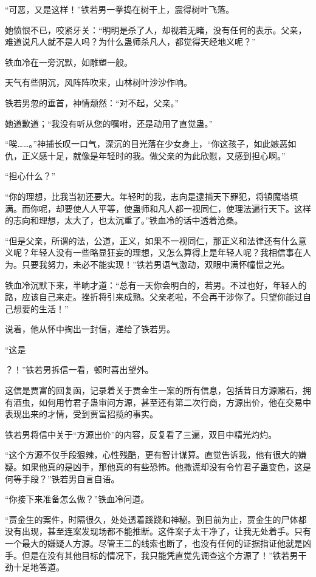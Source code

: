 \begin{this_body}
“可恶，又是这样！”铁若男一拳捣在树干上，震得树叶飞落。

她愤恨不已，咬紧牙关：“明明是杀了人，却视若无睹，没有任何的表示。父亲，难道说凡人就不是人吗？为什么蛊师杀凡人，都觉得天经地义呢？”

铁血冷在一旁沉默，如雕塑一般。

天气有些阴沉，风阵阵吹来，山林树叶沙沙作响。

铁若男忽的垂首，神情颓然：“对不起，父亲。”

她道歉道；“我没有听从您的嘱咐，还是动用了直觉蛊。”

“唉……。”神捕长叹一口气，深沉的目光落在少女身上，“你这孩子，如此嫉恶如仇，正义感十足，就像是年轻时的我。做父亲的为此欣慰，又感到担心啊。”

“担心什么？”

“你的理想，比我当初还要大。年轻时的我，志向是逮捕天下罪犯，将镇魔塔填满。而你呢，却要使人人平等，使蛊师和凡人都一视同仁，使理法遍行天下。这样的志向和理想，太大了，也太沉重了。”铁血冷的话中透着沧桑。

“但是父亲，所谓的法，公道，正义，如果不一视同仁，那正义和法律还有什么意义呢？年轻人没有一些略显狂妄的理想，又怎么算得上是年轻人呢？我相信事在人为。只要我努力，未必不能实现！”铁若男语气激动，双眼中满怀幢憬之光。

铁血冷沉默下来，半晌才道：“总有一天你会明白的，若男。不过也好，年轻人的路，应该自己来走。挫折将引来成熟。父亲老啦，不会再干涉你了。只望你能过自己想要的生活！”

说着，他从怀中掏出一封信，递给了铁若男。

“这是

？！”铁若男拆信一看，顿时喜出望外。

这信是贾富的回复函，记录着关于贾金生一案的所有信息，包括昔日方源赌石，拥有酒虫，如何用竹君子蛊审问方源，甚至还有第二次行商，方源出价，他在交易中表现出来的才情，受到贾富招揽的事实。

铁若男将信中关于“方源出价”的内容，反复看了三遍，双目中精光灼灼。

“这个方源不仅手段狠辣，心性残酷，更有智计谋算。直觉告诉我，他有很大的嫌疑。如果他真的是凶手，那他真的有些恐怖。他撒谎却没有令竹君子蛊变色，这是何等手段？”铁若男自言自语。

“你接下来准备怎么做？”铁血冷问道。

“贾金生的案件，时隔很久，处处透着蹊跷和神秘。到目前为止，贾金生的尸体都没有出现，甚至连案发现场都不能推断。这件案子太干净了，让我无处着手。只有一个最大的嫌疑人方源。尽管王二的线索也断了，也没有任何的证据指证他就是凶手。但是在没有其他目标的情况下，我只能凭直觉先调查这个方源了！”铁若男干劲十足地答道。


\end{this_body}

